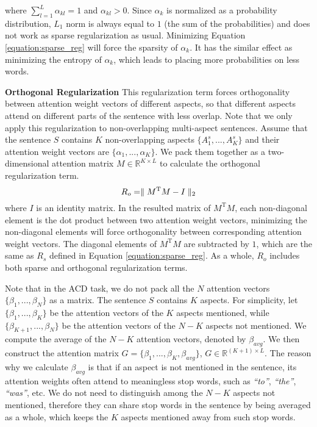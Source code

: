 \documentclass[11pt,a4paper]{article}
\begin{document}
where $\sum\limits_{l=1}^L{\alpha_{kl}}=1$ and $\alpha_{kl}>0$. Since $\alpha_k$ is normalized as a probability distribution, $L_1$ norm is always equal to $1$ (the sum of the probabilities) and does not work as sparse regularization as usual. Minimizing Equation \ref{equation:sparse_reg} will force the sparsity of $\alpha_k$. It has the similar effect as minimizing the entropy of $\alpha_k$, which leads to placing more probabilities on less words.

{\bf Orthogonal Regularization} This regularization term forces orthogonality between attention weight vectors of different aspects, so that different aspects attend on different parts of the sentence with less overlap. Note that we only apply this regularization to non-overlapping multi-aspect sentences. Assume that the sentence $S$ contains $K$ non-overlapping aspects $\{A_1^s,...,A_K^s\}$ and their attention weight vectors are $\{\alpha_1,...,\alpha_K\}$. We pack them together as a two-dimensional attention matrix $M\in\mathbb{R}^{{K}\times{L}}$ to calculate the orthogonal regularization term.
\begin{equation}
\setlength{\abovedisplayskip}{4pt}  %
\setlength{\belowdisplayskip}{4pt}  %
	R_o = \parallel{M^{\mathrm{T}}}M - I\parallel_2
\end{equation}
where $I$ is an identity matrix. In the resulted matrix of ${M^{\mathrm{T}}M}$, each non-diagonal element is the dot product between two attention weight vectors, minimizing the non-diagonal elements will force orthogonality between corresponding attention weight vectors. The diagonal elements of ${M^{\mathrm{T}}M}$ are subtracted by $1$, which are the same as $R_s$ defined in Equation \ref{equation:sparse_reg}. As a whole, $R_o$ includes both sparse and orthogonal regularization terms. 

Note that in the ACD task, we do not pack all the $N$ attention vectors $\{\beta_1, ..., \beta_N\}$ as a matrix. The sentence $S$ contains $K$ aspects. For simplicity, let $\{\beta_1, ..., \beta_K\}$ be the attention vectors of the $K$ aspects mentioned, while $\{\beta_{K+1}, ..., \beta_N\}$ be the attention vectors of the $N-K$ aspects not mentioned. We compute the average of the $N-K$ attention vectors, denoted by $\beta_{avg}$. We then construct the attention matrix $G=\{\beta_{1}, ..., \beta_{K},\beta_{avg}\}$, $G\in\mathbb{R}^{{(K+1)}\times{L}}$. The reason why we calculate $\beta_{avg}$ is that if an aspect is not mentioned in the sentence, its attention weights often attend to meaningless stop words, such as \emph{``to''}, \emph{``the''}, \emph{``was''}, etc. We do not need to distinguish among the $N-K$ aspects not mentioned, therefore they can share stop words in the sentence by being averaged as a whole, which keeps the $K$ aspects mentioned away from such stop words. 
\end{document}
